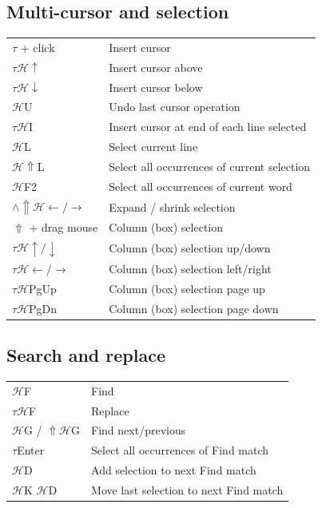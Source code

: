 \documentclass[UTF8]{article}
\begin{document}
\subsection*{Multi-cursor and selection}
\begin{tabular}{ll}
$\tau$ + click & Insert cursor \\
$\tau\mathscr{H}\uparrow$ & Insert cursor above \\
$\tau\mathscr{H}\downarrow$ & Insert cursor below \\
$\mathscr{H}$U & Undo last cursor operation \\
$\tau\mathscr{H}$I & Insert cursor at end of each line selected \\
$\mathscr{H}$L & Select current line \\
$\mathscr{H}\Uparrow$L & Select all occurrences of current selection \\
$\mathscr{H}$F2 & Select all occurrences of current word \\
$\wedge\Uparrow\mathscr{H}\leftarrow / \rightarrow$ & Expand / shrink selection \\
$\Uparrow$ + drag mouse & Column (box) selection \\
$\tau\mathscr{H}\uparrow / \downarrow$ & Column (box) selection up/down \\
$\tau\mathscr{H}\leftarrow / \rightarrow$ & Column (box) selection left/right \\
$\tau\mathscr{H}$PgUp & Column (box) selection page up \\
$\tau\mathscr{H}$PgDn & Column (box) selection page down \\
\end{tabular}

\subsection*{Search and replace}
\begin{tabular}{ll}
$\mathscr{H}$F & Find \\
$\tau\mathscr{H}$F & Replace \\
$\mathscr{H}$G / $\Uparrow\mathscr{H}$G & Find next/previous \\
$\tau$Enter & Select all occurrences of Find match \\
$\mathscr{H}$D & Add selection to next Find match \\
$\mathscr{H}$K $\mathscr{H}$D & Move last selection to next Find match \\
\end{tabular}
\end{document}
